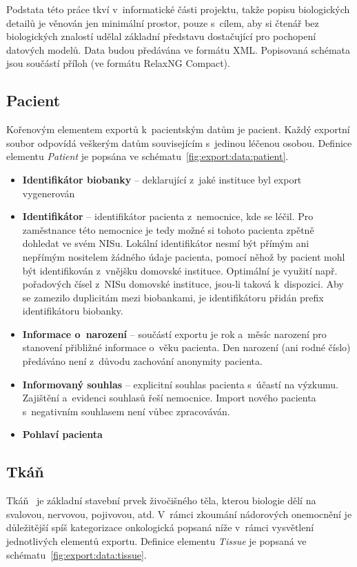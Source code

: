 \documentclass[11pt, draft, oneside]{fithesis2}
\newcommand{\polozka}[1]{\item {\bf #1}\xspace}
\begin{document}
Podstata této práce tkví v~informatické části projektu, takže popisu biologických detailů je věnován jen minimální prostor, pouze s~cílem, aby si čtenář bez biologických znalostí udělal základní představu dostačující pro pochopení datových modelů.
Data budou předávána ve formátu XML. Popisovaná schémata jsou součástí příloh (ve formátu RelaxNG Compact).

\subsection{Pacient}
Kořenovým elementem exportů k~pacientským datům je pacient. Každý exportní soubor odpovídá veškerým datům souvisejícím s~jedinou léčenou osobou. Definice elementu \textit{Patient} je popsána ve schématu~\ref{fig:export:data:patient}.

\begin{itemize}
		\polozka{Identifikátor biobanky} -- deklarující z~jaké instituce byl export vygenerován

		\polozka{Identifikátor} -- identifikátor pacienta z~nemocnice, kde se léčil. Pro zaměstnance této nemocnice je tedy možné si tohoto pacienta zpětně dohledat ve svém NISu. Lokální identifikátor nesmí být přímým ani nepřímým nositelem žádného údaje pacienta, pomocí něhož by pacient mohl být identifikován z~vnějšku domovské instituce. Optimální je využití např. pořadových čísel z~NISu domovské instituce, jsou-li taková k~dispozici. Aby se zamezilo duplicitám mezi biobankami, je identifikátoru přidán prefix identifikátoru biobanky.
		
		\polozka{Informace o~narození} -- součástí exportu je rok a~měsíc narození pro stanovení přibližné informace o~věku pacienta. Den narození (ani rodné číslo) předáváno není z~důvodu zachování anonymity pacienta.
		
		\polozka{Informovaný souhlas} -- explicitní souhlas pacienta s~účastí na výzkumu. Zajištění a~evidenci souhlasů řeší nemocnice. Import nového pacienta s~negativním souhlasem není vůbec zpracováván.
			
		\polozka{Pohlaví pacienta}
		
	\end{itemize}



\subsection{Tkáň}
Tkáň~\cite{anatomie} je základní stavební prvek živočišného těla, kterou biologie dělí na svalovou, nervovou, pojivovou, atd. V~rámci zkoumání nádorových onemocnění je důležitější spíš kategorizace onkologická popsaná níže v~rámci vysvětlení jednotlivých elementů exportu.
Definice elementu \textit{Tissue} je popsaná ve schématu~\ref{fig:export:data:tissue}.
\end{document}
